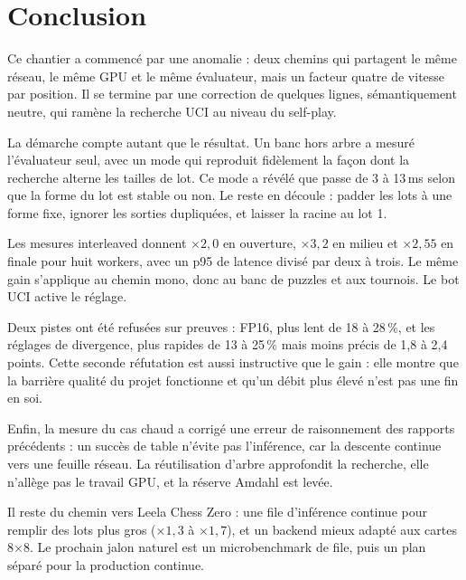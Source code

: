 \section{Conclusion}

Ce chantier a commenc\'e par une anomalie : deux chemins qui partagent le
m\^eme r\'eseau, le m\^eme GPU et le m\^eme \'evaluateur, mais un facteur
quatre de vitesse par position. Il se termine par une correction de quelques
lignes, s\'emantiquement neutre, qui ram\`ene la recherche UCI au niveau du
self-play.

La d\'emarche compte autant que le r\'esultat. Un banc hors arbre a mesur\'e
l'\'evaluateur seul, avec un mode qui reproduit fid\`element la fa\c con dont
la recherche alterne les tailles de lot. Ce mode a r\'ev\'el\'e que
 passe de 3 \`a 13\,ms selon que la forme du lot est stable
ou non. Le reste en d\'ecoule : padder les lots \`a une forme fixe, ignorer les
sorties dupliqu\'ees, et laisser la racine au lot 1.

Les mesures interleaved donnent $\times 2{,}0$ en ouverture, $\times 3{,}2$ en
milieu et $\times 2{,}55$ en finale pour huit workers, avec un p95 de latence
divis\'e par deux \`a trois. Le m\^eme gain s'applique au chemin mono, donc au
banc de puzzles et aux tournois. Le bot UCI active le r\'eglage.

Deux pistes ont \'et\'e refus\'ees sur preuves : FP16, plus lent de 18 \`a
28\,\%, et les r\'eglages de divergence, plus rapides de 13 \`a 25\,\% mais
moins pr\'ecis de 1,8 \`a 2,4 points. Cette seconde r\'efutation est aussi
instructive que le gain : elle montre que la barri\`ere qualit\'e du projet
fonctionne et qu'un d\'ebit plus \'elev\'e n'est pas une fin en soi.

Enfin, la mesure du cas chaud a corrig\'e une erreur de raisonnement des
rapports pr\'ec\'edents : un succ\`es de table n'\'evite pas l'inf\'erence, car
la descente continue vers une feuille r\'eseau. La r\'eutilisation d'arbre
approfondit la recherche, elle n'all\`ege pas le travail GPU, et la r\'eserve
Amdahl est lev\'ee.

Il reste du chemin vers Leela Chess Zero : une file d'inf\'erence continue
pour remplir des lots plus gros ($\times 1{,}3$ \`a $\times 1{,}7$), et un
backend mieux adapt\'e aux cartes 8$\times$8. Le prochain jalon naturel est un
microbenchmark de file, puis un plan s\'epar\'e pour la production continue.
